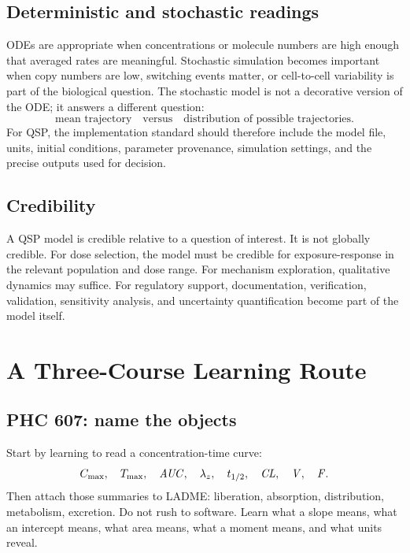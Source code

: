\documentclass[a4paper]{article}
\newcommand{\pkCL}{\pksym{CL}}
\newcommand{\pkV}{\pksym{V}}
\newcommand{\pkF}{\pksym{F}}
\newcommand{\pkAUC}{\pksym{AUC}}
\newcommand{\pkCmax}{C_{\max}}
\newcommand{\pkTmax}{T_{\max}}
\begin{document}
\figureQSPWorkflow

\subsection{Deterministic and stochastic readings}

ODEs are appropriate when concentrations or molecule numbers are high enough that averaged rates are meaningful. Stochastic simulation becomes important when copy numbers are low, switching events matter, or cell-to-cell variability is part of the biological question. The stochastic model is not a decorative version of the ODE; it answers a different question:
\[
  \text{mean trajectory}
  \quad \text{versus} \quad
  \text{distribution of possible trajectories}.
\]
For QSP, the implementation standard should therefore include the model file, units, initial conditions, parameter provenance, simulation settings, and the precise outputs used for decision.

\subsection{Credibility}

A QSP model is credible relative to a question of interest. It is not globally credible. For dose selection, the model must be credible for exposure-response in the relevant population and dose range. For mechanism exploration, qualitative dynamics may suffice. For regulatory support, documentation, verification, validation, sensitivity analysis, and uncertainty quantification become part of the model itself.

\section{A Three-Course Learning Route}

\subsection{PHC 607: name the objects}

Start by learning to read a concentration-time curve:
\[
  \pkCmax,\quad \pkTmax,\quad \pkAUC,\quad \lambda_z,\quad t_{1/2},\quad \pkCL,\quad \pkV,\quad \pkF.
\]
Then attach those summaries to LADME: liberation, absorption, distribution, metabolism, excretion. Do not rush to software. Learn what a slope means, what an intercept means, what area means, what a moment means, and what units reveal.
\end{document}
